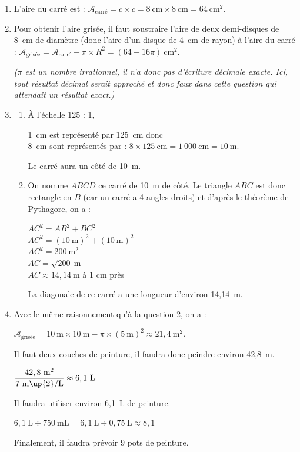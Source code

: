 \begin{enumerate}[itemsep=1em]
	\item L'aire du carré est : $\mathcal{A}_\text{carré} = c \times c = 8~\text{cm} \times 8~\text{cm} = 64~\text{cm}^2$.
	\item Pour obtenir l'aire grisée, il faut soustraire l'aire de deux demi-disques de 8~cm de diamètre (donc l'aire d'un disque de 4~cm de rayon) à l'aire du carré : $\mathcal{A}_\text{grisée} = \mathcal{A}_\text{carré} - \pi\times R^2 = (64 - 16\pi)~\text{cm}^2$.
	
	\medskip
	\textit{($\pi$ est un nombre irrationnel, il n'a donc pas d'écriture décimale exacte. Ici, tout résultat décimal serait approché et donc faux dans cette question qui attendait un résultat exact.)}
	\item 
	\begin{enumerate}
		\item À l'échelle 125 : 1,
		 
		 1~cm est représenté par 125~cm donc \\
		 8~cm sont représentés par : $8\times125~\text{cm}=1~000~\text{cm}=10~\text{m}$.
		 
		 \medskip
		Le carré aura un côté de 10~m.
		\item On nomme $ABCD$ ce carré de 10~m de côté. Le triangle $ABC$ est donc rectangle en $B$ (car un carré a 4 angles droits) et d'après le théorème de Pythagore, on a :
		
		$AC^2=AB^2+BC^2$\\
		$AC^2=(10~\text{m})^2+(10~\text{m})^2$\\
		$AC^2=200~\text{m}^2$\\
		$AC=\sqrt{200}~\text{m}$\\
		$AC\approx14,14~\text{m}$ à 1 cm près
		
		\medskip
		La diagonale de ce carré a une longueur d'environ 14,14~m.
	\end{enumerate}
	
	\item %
	
	Avec le même raisonnement qu'à la question 2, on a : 
	
	$\mathcal{A}_\text{grisée} = 10~\text{m} \times 10~\text{m} - \pi\times (5~\text{m})^2 \approx 21,4~\text{m}^2$.
	
	\medskip
	Il faut deux couches de peinture, il faudra donc peindre environ 42,8~m.
	
	\medskip
	$\dfrac{42,8~\text{m}^2}{7~\text{m\up{2}/L}}\approx6,1~\text{L}$
	
	\medskip
	Il faudra utiliser environ 6,1~L de peinture.
	
	\medskip
	$6,1~\text{L}\div750~\text{mL}=6,1~\text{L}\div0,75~\text{L}\approx8,1$
	
	\medskip
	Finalement, il faudra prévoir 9 pots de peinture.
	
	\end{enumerate}